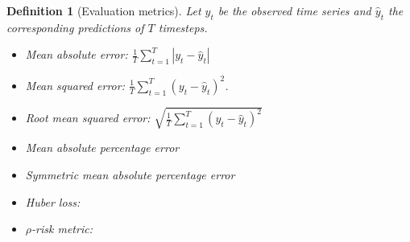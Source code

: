\documentclass[12pt,a4paper]{article}
\newtheorem{definition}{Definition}
\begin{document}
\begin{definition}[Evaluation metrics]
	Let $y_t$ be the observed time series and  $\hat y_t$ the corresponding predictions of $T$ timesteps.
	\begin{itemize}
		\item Mean absolute error:  $\frac{1}{T}\sum_{t=1}^T \left | y_t - \hat y_t\right |$
		  \item Mean squared error: $\frac{1}{T}\sum_{t=1}^T \left ( y_t - \hat y_t\right ) ^2$. 
		  \item Root mean squared error:  $\sqrt{\frac{1}{T}\sum_{t=1}^T \left ( y_t - \hat y_t\right ) ^2}$
		  \item Mean absolute percentage error
		  \item Symmetric mean absolute percentage error
		  \item Huber loss: 
		  \item $\rho$-risk metric:
		  
	\end{itemize}
\end{definition}
\end{document}
